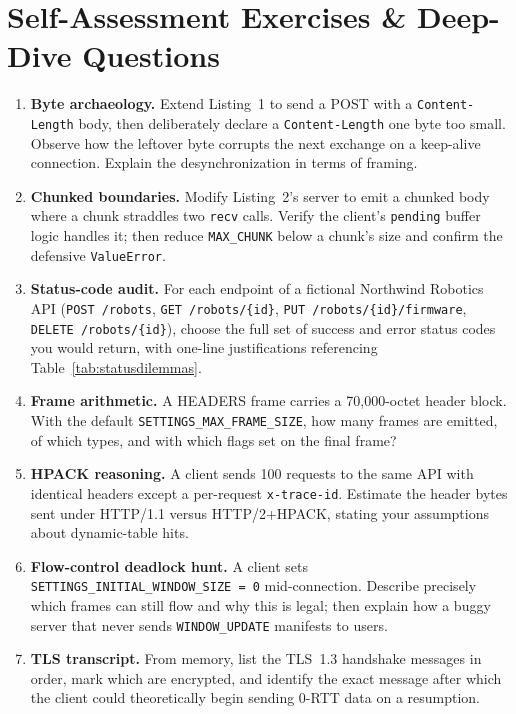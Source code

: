 \section{Self-Assessment Exercises \& Deep-Dive Questions}

\begin{enumerate}[label=\textbf{E1.\arabic*}, leftmargin=3.2em]
  \item \textbf{Byte archaeology.} Extend Listing~1 to send a POST with a \texttt{Content-Length} body, then deliberately declare a \texttt{Content-Length} one byte too small. Observe how the leftover byte corrupts the next exchange on a keep-alive connection. Explain the desynchronization in terms of framing.
  \item \textbf{Chunked boundaries.} Modify Listing~2's server to emit a chunked body where a chunk straddles two \texttt{recv} calls. Verify the client's \texttt{pending} buffer logic handles it; then reduce \texttt{MAX\_CHUNK} below a chunk's size and confirm the defensive \texttt{ValueError}.
  \item \textbf{Status-code audit.} For each endpoint of a fictional Northwind Robotics API (\texttt{POST /robots}, \texttt{GET /robots/\{id\}}, \texttt{PUT /robots/\{id\}/firmware}, \texttt{DELETE /robots/\{id\}}), choose the full set of success and error status codes you would return, with one-line justifications referencing Table~\ref{tab:statusdilemmas}.
  \item \textbf{Frame arithmetic.} A HEADERS frame carries a 70{,}000-octet header block. With the default \texttt{SETTINGS\_MAX\_FRAME\_SIZE}, how many frames are emitted, of which types, and with which flags set on the final frame?
  \item \textbf{HPACK reasoning.} A client sends 100 requests to the same API with identical headers except a per-request \texttt{x-trace-id}. Estimate the header bytes sent under HTTP/1.1 versus HTTP/2+HPACK, stating your assumptions about dynamic-table hits.
  \item \textbf{Flow-control deadlock hunt.} A client sets \texttt{SETTINGS\_INITIAL\_WINDOW\_SIZE = 0} mid-connection. Describe precisely which frames can still flow and why this is legal; then explain how a buggy server that never sends \texttt{WINDOW\_UPDATE} manifests to users.
  \item \textbf{TLS transcript.} From memory, list the TLS~1.3 handshake messages in order, mark which are encrypted, and identify the exact message after which the client could theoretically begin sending 0-RTT data on a resumption.

\end{enumerate}
